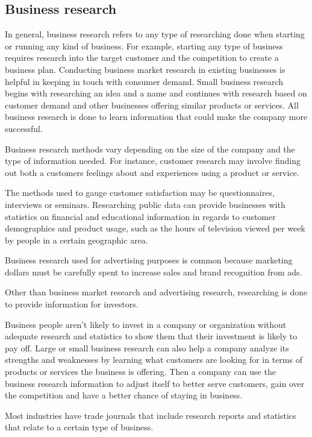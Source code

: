 \documentclass[12pt, a4paper]{report}
\begin{document}
\subsection{Business research}
In general, business research refers to any type of researching done when starting or running any kind of business. For example, starting any type of business requires research into the target customer and the competition to create a business plan. Conducting business market research in existing businesses is helpful in keeping in touch with consumer demand. Small business research begins with researching an idea and a name and continues with research based on customer demand and other businesses offering similar products or services. All business research is done to learn information that could make the company more successful.

Business research methods vary depending on the size of the company and the type of information needed. For instance, customer research may involve finding out both a customers feelings about and experiences using a product or service.

The methods used to gauge customer satisfaction may  be questionnaires, interviews or seminars. Researching public data can provide businesses with statistics on financial and educational information in regards to customer demographics and product usage, such as the hours of television viewed per week by people in a certain geographic area.

Business research used for advertising purposes is common because marketing dollars must be carefully spent to increase sales and brand recognition from ads.

Other than business market research and advertising research, researching is done to provide information for investors.

Business people aren't likely to invest in a company or organization without adequate research and statistics to show them that their investment is likely to pay off. Large or small business research can also help a company analyze its strengths and weaknesses by learning what customers are looking for in terms of products or services the business is offering. Then a company can use the business research information to adjust itself to better serve customers, gain over the competition and have a better chance of staying in business.

Most industries have trade journals that include research reports and statistics that relate to a certain type of business.
\end{document}
